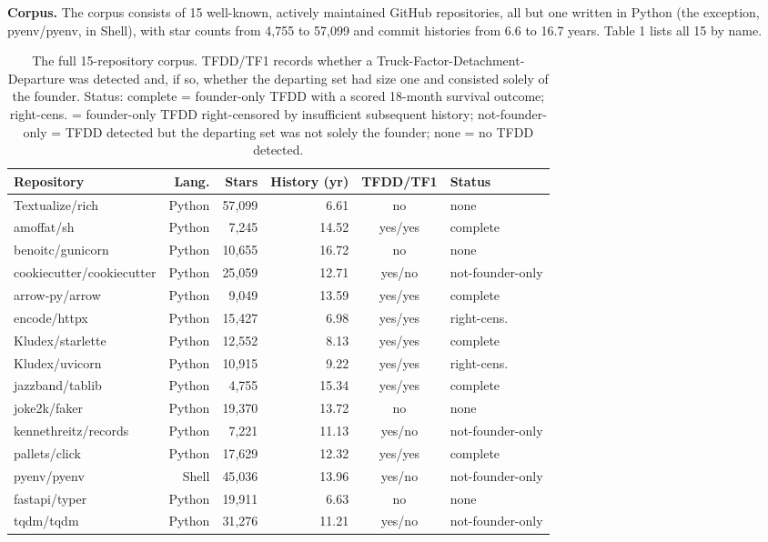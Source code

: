 \documentclass[11pt,letterpaper]{article}
\begin{document}
\textbf{Corpus.} The corpus consists of 15 well-known, actively maintained GitHub repositories, all but one written in Python (the exception, pyenv/pyenv, in Shell), with star counts from 4,755 to 57,099 and commit histories from 6.6 to 16.7 years. Table 1 lists all 15 by name.

\begin{table}[t]
\centering
\small
\caption{The full 15-repository corpus. TFDD/TF1 records whether a Truck-Factor-Detachment-Departure was detected and, if so, whether the departing set had size one and consisted solely of the founder. Status: complete = founder-only TFDD with a scored 18-month survival outcome; right-cens. = founder-only TFDD right-censored by insufficient subsequent history; not-founder-only = TFDD detected but the departing set was not solely the founder; none = no TFDD detected.}
\label{tab:corpus}
\begin{tabular}{lrrrcl}
\toprule
Repository & Lang. & Stars & History (yr) & TFDD/TF1 & Status \\
\midrule
Textualize/rich & Python & 57{,}099 & 6.61 & no & none \\
amoffat/sh & Python & 7{,}245 & 14.52 & yes/yes & complete \\
benoitc/gunicorn & Python & 10{,}655 & 16.72 & no & none \\
cookiecutter/cookiecutter & Python & 25{,}059 & 12.71 & yes/no & not-founder-only \\
arrow-py/arrow & Python & 9{,}049 & 13.59 & yes/yes & complete \\
encode/httpx & Python & 15{,}427 & 6.98 & yes/yes & right-cens. \\
Kludex/starlette & Python & 12{,}552 & 8.13 & yes/yes & complete \\
Kludex/uvicorn & Python & 10{,}915 & 9.22 & yes/yes & right-cens. \\
jazzband/tablib & Python & 4{,}755 & 15.34 & yes/yes & complete \\
joke2k/faker & Python & 19{,}370 & 13.72 & no & none \\
kennethreitz/records & Python & 7{,}221 & 11.13 & yes/no & not-founder-only \\
pallets/click & Python & 17{,}629 & 12.32 & yes/yes & complete \\
pyenv/pyenv & Shell & 45{,}036 & 13.96 & yes/no & not-founder-only \\
fastapi/typer & Python & 19{,}911 & 6.63 & no & none \\
tqdm/tqdm & Python & 31{,}276 & 11.21 & yes/no & not-founder-only \\
\bottomrule
\end{tabular}
\end{table}
\end{document}
